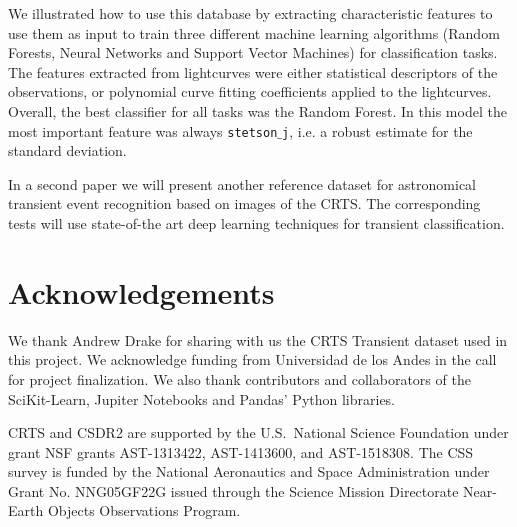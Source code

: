 \documentclass[usenatbib]{mnras}
\begin{document}
We illustrated how to use this database by extracting 
characteristic features to use them as input to train three different
machine learning algorithms (Random Forests, Neural Networks and
Support Vector Machines) for classification tasks.
The features extracted from lightcurves were either statistical
descriptors of the observations, or polynomial curve fitting
coefficients applied to the lightcurves.   
Overall, the best classifier for all tasks was the Random Forest.
In this model the most important feature was always
\texttt{stetson$\_$j}, i.e. a robust estimate for the standard
deviation. 

In a second paper we will present another reference dataset for
astronomical transient event recognition based on images of the
CRTS.
The corresponding tests will use  state-of-the art deep learning
techniques for transient classification. 

\section*{Acknowledgements}

We thank Andrew Drake for sharing with us the CRTS Transient dataset
used in this project.  
We acknowledge funding from Universidad de los Andes in the call for
project finalization.
We also thank contributors and collaborators of the SciKit-Learn,
Jupiter Notebooks and Pandas' Python libraries.  

CRTS and CSDR2 are supported by the U.S.~National Science 
Foundation under grant NSF grants AST-1313422, AST-1413600, and 
AST-1518308.  The CSS survey is funded by the National Aeronautics
and Space Administration under Grant No. NNG05GF22G issued through
the Science Mission Directorate Near-Earth Objects Observations Program.



\end{document}

